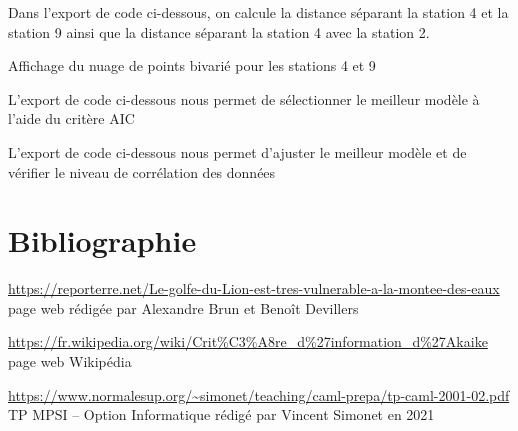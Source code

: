 \documentclass[a4paper,french,10pt]{article}
\begin{document}
Dans l'export de code ci-dessous, on calcule la distance séparant la station 4 et la station 9 ainsi que la distance séparant la station 4 avec la station 2.


Affichage du nuage de points bivarié pour les stations 4 et 9


L'export de code ci-dessous nous permet de sélectionner le meilleur modèle à l'aide du critère AIC


L'export de code ci-dessous nous permet d'ajuster le meilleur modèle et de vérifier le niveau de corrélation des données


\newpage

\section{Bibliographie}

\renewcommand\refname{}
\begin{thebibliography}{9}
	\url{https://reporterre.net/Le-golfe-du-Lion-est-tres-vulnerable-a-la-montee-des-eaux}
	page web rédigée par Alexandre Brun et Benoît Devillers
	
	\url{https://fr.wikipedia.org/wiki/Crit%C3%A8re_d%27information_d%27Akaike}
	page web Wikipédia
	
	\url{https://www.normalesup.org/~simonet/teaching/caml-prepa/tp-caml-2001-02.pdf}
	TP MPSI – Option Informatique rédigé par Vincent Simonet en 2021
\end{thebibliography}
\end{document}
